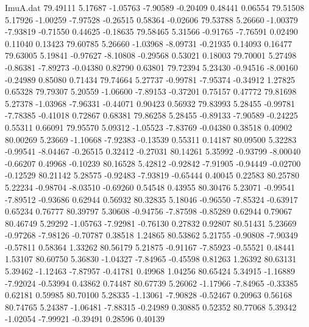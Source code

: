 \begin{filecontents}{ImuA.dat}
  79.49111    5.17687   -1.05763   -7.90589   -0.20409    0.48441    0.06554
  79.51508    5.17926   -1.00259   -7.97528   -0.26515    0.58364   -0.02606
  79.53788    5.26660   -1.00379   -7.93819   -0.71550    0.44625   -0.18635
  79.58465    5.31566   -0.91765   -7.76591    0.02490    0.11040    0.13423
  79.60785    5.26660   -1.03968   -8.09731   -0.21935    0.14093    0.16477
  79.63005    5.19841   -0.97627   -8.10808   -0.29568    0.53021    0.18003
  79.70001    5.27498   -0.86381   -7.89273   -0.04380    0.82790    0.63801
  79.72394    5.23430   -0.94516   -8.00160   -0.24989    0.85080    0.71434
  79.74664    5.27737   -0.99781   -7.95374   -0.34912    1.27825    0.65328
  79.79307    5.20559   -1.06600   -7.89153   -0.37201    0.75157    0.47772
  79.81698    5.27378   -1.03968   -7.96331   -0.44071    0.90423    0.56932
  79.83993    5.28455   -0.99781   -7.78385   -0.41018    0.72867    0.68381
  79.86258    5.28455   -0.89133   -7.90589   -0.24225    0.55311    0.66091
  79.95570    5.09312   -1.05523   -7.83769   -0.04380    0.38518    0.40902
  80.00269    5.23669   -1.10668   -7.92383   -0.13539    0.55311    0.14187
  80.09500    5.32283   -0.99541   -8.04467   -0.26515    0.32412   -0.27031
  80.14261    5.35992   -0.93799   -8.00040   -0.66207    0.49968   -0.10239
  80.16528    5.42812   -0.92842   -7.91905   -0.94449   -0.02700   -0.12529
  80.21142    5.28575   -0.92483   -7.93819   -0.65444    0.40045    0.22583
  80.25780    5.22234   -0.98704   -8.03510   -0.69260    0.54548    0.43955
  80.30476    5.23071   -0.99541   -7.89512   -0.93686    0.62944    0.56932
  80.32835    5.18046   -0.96550   -7.85324   -0.63917    0.65234    0.76777
  80.39797    5.30608   -0.94756   -7.87598   -0.85289    0.62944    0.79067
  80.46749    5.29292   -1.05763   -7.92981   -0.76130    0.27832    0.92807
  80.51431    5.23669   -0.97268   -7.98126   -0.70787    0.38518    1.24865
  80.53862    5.21755   -0.90808   -7.90349   -0.57811    0.58364    1.33262
  80.56179    5.21875   -0.91167   -7.85923   -0.55521    0.48441    1.53107
  80.60750    5.36830   -1.04327   -7.84965   -0.45598    0.81263    1.26392
  80.63131    5.39462   -1.12463   -7.87957   -0.41781    0.49968    1.04256
  80.65424    5.34915   -1.16889   -7.92024   -0.53994    0.43862    0.74487
  80.67739    5.26062   -1.17966   -7.84965   -0.33385    0.62181    0.59985
  80.70100    5.28335   -1.13061   -7.90828   -0.52467    0.20963    0.56168
  80.74765    5.24387   -1.06481   -7.88315   -0.24989    0.30885    0.52352
  80.77068    5.39342   -1.02054   -7.99921   -0.39491    0.28596    0.40139

\end{filecontents}
